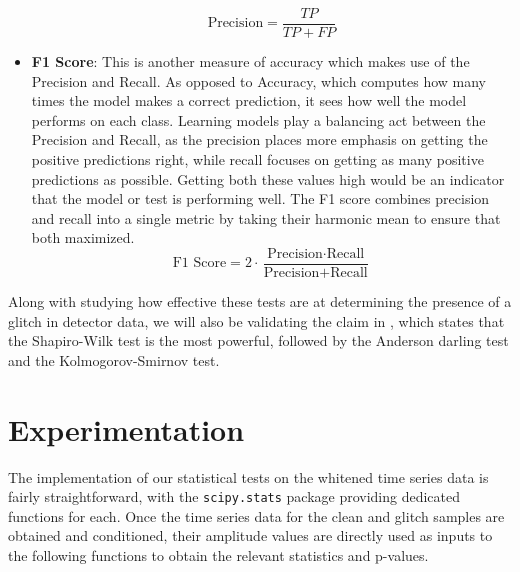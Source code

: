 \documentclass[12pt]{article}
\begin{document}
\begin{itemize}
    \begin{equation}
      \text{Precision} = \frac{TP}{TP + FP}
    \end{equation}
  \item \textbf{F1 Score}: This is another measure of accuracy which makes use of the Precision and Recall. As opposed to Accuracy, which computes how many times the model makes a correct prediction, it sees how well the model performs on each class. Learning models play a balancing act between the Precision and Recall, as the precision places more emphasis on getting the positive predictions right, while recall focuses on getting as many positive predictions as possible. Getting both these values high would be an indicator that the model or test is performing well. The F1 score combines precision and recall into a single metric by taking their harmonic mean to ensure that both maximized.
    \begin{equation}
      \text{F1 Score} = 2 \cdot \frac{\text{Precision} \cdot \text{Recall}}{\text{Precision} + \text{Recall}}
    \end{equation}
\end{itemize}

\medskip
\noindent Along with studying how effective these tests are at determining the presence of a glitch in detector data, we will also be validating the claim in \cite{razali2011power}, which states that the Shapiro-Wilk test is the most powerful, followed by the Anderson darling test and the Kolmogorov-Smirnov test.



\pagebreak
\section{Experimentation}\label{Experimentation}

The implementation of our statistical tests on the whitened time series data is fairly straightforward, with the \texttt{scipy.stats} package providing dedicated functions for each. Once the time series data for the clean and glitch samples are obtained and conditioned, their amplitude values are directly used as inputs to the following functions to obtain the relevant statistics and p-values.
\end{document}

